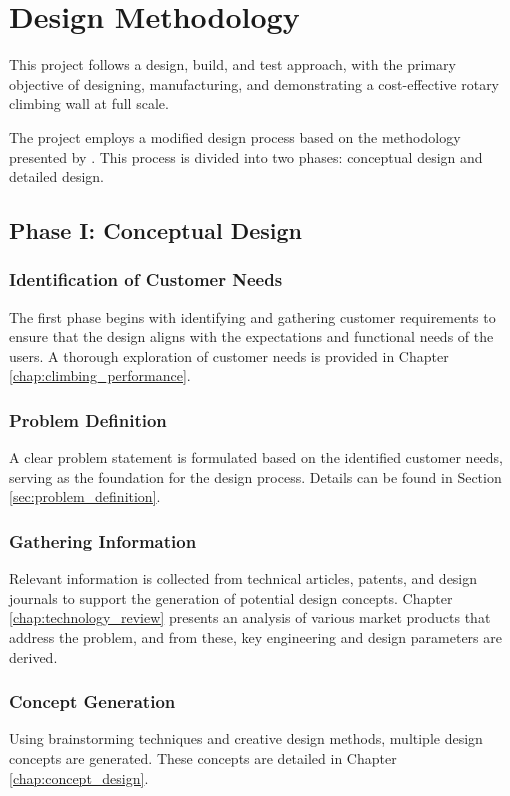 \chapter{Design Methodology}
\label{chap:design_methodology}

This project follows a design, build, and test approach, with the primary objective of designing, manufacturing, and demonstrating a cost-effective rotary climbing wall at full scale.

The project employs a modified design process based on the methodology presented by \cite{dieter_schmidt_2021}. This process is divided into two phases: conceptual design and detailed design.

\section{Phase I: Conceptual Design}

\subsection{Identification of Customer Needs}
The first phase begins with identifying and gathering customer requirements to ensure that the design aligns with the expectations and functional needs of the users. A thorough exploration of customer needs is provided in Chapter \ref{chap:climbing_performance}.

\subsection{Problem Definition}
A clear problem statement is formulated based on the identified customer needs, serving as the foundation for the design process. Details can be found in Section \ref{sec:problem_definition}.

\subsection{Gathering Information}
Relevant information is collected from technical articles, patents, and design journals to support the generation of potential design concepts. Chapter \ref{chap:technology_review} presents an analysis of various market products that address the problem, and from these, key engineering and design parameters are derived.

\subsection{Concept Generation}
Using brainstorming techniques and creative design methods, multiple design concepts are generated. These concepts are detailed in Chapter \ref{chap:concept_design}.

